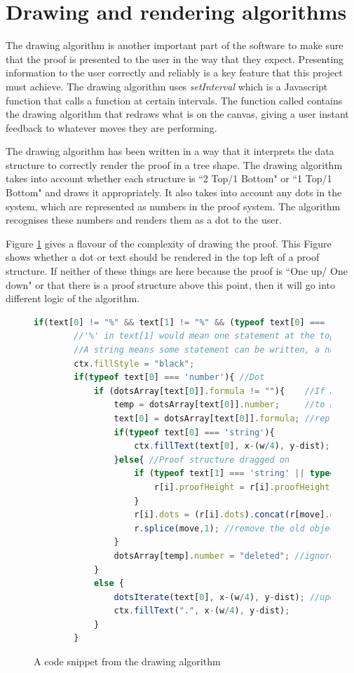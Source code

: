 \section{Drawing and rendering algorithms}

The drawing algorithm is another important part of the software to make sure that the proof is presented to the user in the way that they expect. Presenting information to the user correctly and reliably is a key feature that this project must achieve. The drawing algorithm uses \textit{setInterval} which is a Javascript function that calls a function at certain intervals. The function called contains the drawing algorithm that redraws what is on the canvas, giving a user instant feedback to whatever moves they are performing.

The drawing algorithm has been written in a way that it interprets the data structure to correctly render the proof in a tree shape. The drawing algorithm takes into account whether each structure is ``2 Top/1 Bottom" or ``1 Top/1 Bottom" and draws it appropriately. It also takes into account any dots in the system, which are represented as numbers in the proof system. The algorithm recognises these numbers and renders them as a dot to the user. 

Figure \ref{fig:myDown} gives a flavour of the complexity of drawing the proof. This Figure shows whether a dot or text should be rendered in the top left of a proof structure. If neither of these things are here because the proof is ``One up/ One down" or that there is a proof structure above this point, then it will go into different logic of the algorithm.   

\begin{figure}[H]
\begin{lstlisting}[language=JavaScript]
if(text[0] != "%" && text[1] != "%" && (typeof text[0] === 'string' || typeof text[0] === 'number')) {
		//'%' in text[1] would mean one statement at the top of the proof.
		//A string means some statement can be written, a number represents a dot.
		ctx.fillStyle = "black";
		if(typeof text[0] === 'number'){ //Dot
			if (dotsArray[text[0]].formula != ""){    //If a statement has been dragged on 
				temp = dotsArray[text[0]].number;     //to an object, change the array to 
				text[0] = dotsArray[text[0]].formula; //represent that statement in the object
				if(typeof text[0] === 'string'){
					ctx.fillText(text[0], x-(w/4), y-dist);
				}else{ //Proof structure dragged on
					if (typeof text[1] === 'string' || typeof text[1] === 'number'){
						r[i].proofHeight = r[i].proofHeight + r[move].proofHeight - 1;
					}
					r[i].dots = (r[i].dots).concat(r[move].dots); //Update the dots an object holds
					r.splice(move,1); //remove the old object from the canvas
				}
				dotsArray[temp].number = "deleted"; //ignore the dots in the old object
			}
			else {
				dotsIterate(text[0], x-(w/4), y-dist); //update position of dots 
				ctx.fillText(".", x-(w/4), y-dist);
			}
		}			
\end{lstlisting}
\caption{A code snippet from the drawing algorithm}
\label{fig:myDown}
\end{figure}

